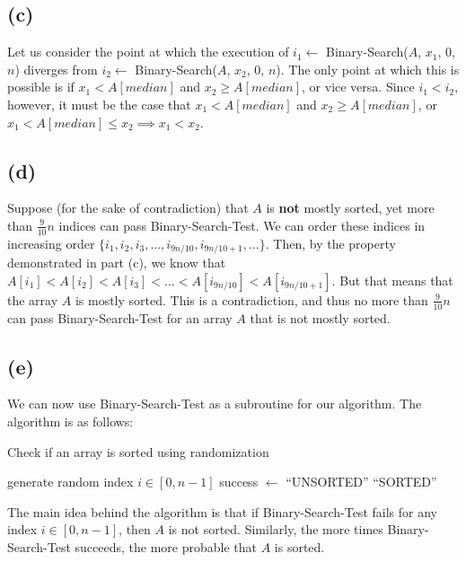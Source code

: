 \documentclass{6046}
\begin{document}
\subsection*{(c)}
Let us consider the point at which the execution of
$i_1 \leftarrow$ {\sc Binary-Search($A$, $x_1$, $0$, $n$)}
diverges from  $i_2 \leftarrow$ {\sc Binary-Search($A$, $x_2$, $0$, $n$)}. The only point
at which this is possible is if $x_1 < A[median]$ and
$x_2 \ge A[median]$, or vice versa. Since $i_1 < i_2$, however,
it must be the case that $x_1 < A[median]$ and $x_2 \ge A[median]$,
or $x_1 < A[median] \le x_2 \implies x_1 < x_2$.

\subsection*{(d)}
Suppose (for the sake of contradiction) that $A$ is {\bf not}
mostly sorted, yet more than $\frac{9}{10}n$
indices can pass {\sc Binary-Search-Test}. We can order these indices
in increasing order $\{i_1, i_2, i_3, ..., i_{9n/10}, i_{9n/10 + 1}, ...\}$.
Then, by the property demonstrated in part (c), we know that
$A[i_1] < A[i_2] < A[i_3] < ... < A[i_{9n/10}] < A[i_{9n/10 + 1}]$.
But that means that the array $A$ is mostly sorted.
This is a contradiction, and thus no more than $\frac{9}{10}n$ can
pass {\sc Binary-Search-Test} for an array $A$ that is
not mostly sorted.

\subsection*{(e)}
We can now use {\sc Binary-Search-Test} as a subroutine for our
algorithm. The algorithm is as follows:

\begin{algorithm}[H]
  \caption{Check if an array is sorted using randomization}\label{RandCheck}
  \begin{algorithmic}[0]
        \State generate random index $i \in [0, n - 1]$
        \State success $\leftarrow$ 
            \State \Return ``UNSORTED''
        \EndIf
    \EndFor
    \State \Return ``SORTED''
    \EndFunction
  \end{algorithmic}
\end{algorithm}

The main idea behind the algorithm is that if {\sc Binary-Search-Test}
fails for any index $i \in [0, n - 1]$, then $A$ is not sorted.
Similarly, the more times {\sc Binary-Search-Test} succeeds, the
more probable that $A$ is sorted.
\end{document}

